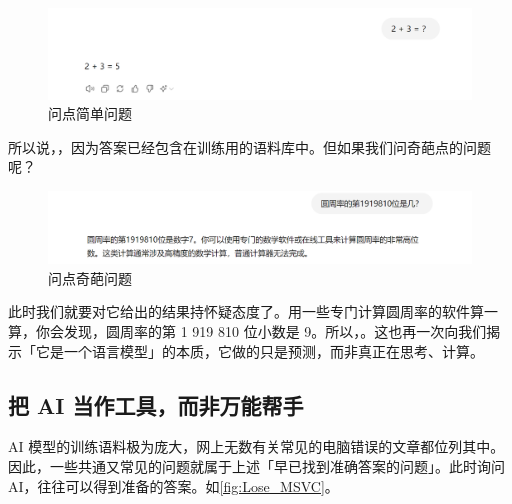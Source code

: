 \begin{figure}[htb!]
  \centering
  \includegraphics[width=.8\textwidth]{assets/basic/2+3.png}
  \caption{问点简单问题}
  \label{fig:2_plus_3}
\end{figure}

所以说，，因为答案已经包含在训练用的语料库中。但如果我们问奇葩点的问题呢？

\begin{figure}[htb!]
  \centering
  \includegraphics[width=.9\textwidth]{assets/basic/191810th_of_pi.png}
  \caption{问点奇葩问题}
  \label{fig:191810th_of_pi}
\end{figure}

此时我们就要对它给出的结果持怀疑态度了。用一些专门计算圆周率的软件算一算，你会发现，圆周率的第 1 919 810 位小数是 9。所以，。这也再一次向我们揭示「它是一个语言模型」的本质，它做的只是预测，而非真正在思考、计算。

\subsection{把 AI 当作工具，而非万能帮手}

AI 模型的训练语料极为庞大，网上无数有关常见的电脑错误的文章都位列其中。因此，一些共通又常见的问题就属于上述「早已找到准确答案的问题」。此时询问 AI，往往可以得到准备的答案。如\autoref{fig:Lose_MSVC}。

